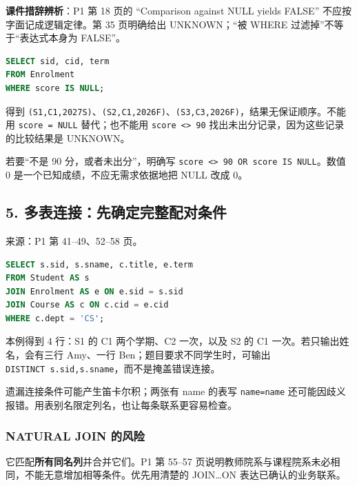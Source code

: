 \textbf{课件措辞辨析}：P1 第 18 页的 ``Comparison against NULL yields FALSE'' 不应按字面记成逻辑定律。第 35 页明确给出 UNKNOWN；``被 WHERE 过滤掉''不等于``表达式本身为 FALSE''。

\Needspace{75pt}
\begin{lstlisting}[language=SQL]
SELECT sid, cid, term
FROM Enrolment
WHERE score IS NULL;
\end{lstlisting}

得到 \texttt{(\allowbreak{}S1,\allowbreak{}C1,\allowbreak{}2027S)\allowbreak{}}、\texttt{(\allowbreak{}S2,\allowbreak{}C1,\allowbreak{}2026F)\allowbreak{}}、\texttt{(\allowbreak{}S3,\allowbreak{}C3,\allowbreak{}2026F)\allowbreak{}}，结果无保证顺序。不能用 \texttt{score\ =\ NULL} 替代；也不能用 \texttt{score\ \textless{}\textgreater{}\ 90} 找出未出分记录，因为这些记录的比较结果是 UNKNOWN。

若要``不是 90 分，或者未出分''，明确写 \texttt{score\ \textless{}\textgreater{}\ 90\ OR\ score\ IS\ NULL}。数值 0 是一个已知成绩，不应无需求依据地把 NULL 改成 0。

\subsection{5. 多表连接：先确定完整配对条件}\label{06_sql_queries_zh-ux591aux8868ux8fdeux63a5ux5148ux786eux5b9aux5b8cux6574ux914dux5bf9ux6761ux4ef6}

来源：P1 第 41--49、52--58 页。

\Needspace{105pt}
\begin{lstlisting}[language=SQL]
SELECT s.sid, s.sname, c.title, e.term
FROM Student AS s
JOIN Enrolment AS e ON e.sid = s.sid
JOIN Course AS c ON c.cid = e.cid
WHERE c.dept = 'CS';
\end{lstlisting}

本例得到 4 行：S1 的 C1 两个学期、C2 一次，以及 S2 的 C1 一次。若只输出姓名，会有三行 Amy、一行 Ben；题目要求不同学生时，可输出 \texttt{DISTINCT\ s.\allowbreak{}sid,\allowbreak{}s.\allowbreak{}sname}，而不是掩盖错误连接。

遗漏连接条件可能产生笛卡尔积；两张有 name 的表写 \texttt{name=name} 还可能因歧义报错。用表别名限定列名，也让每条联系更容易检查。

\subsubsection{NATURAL JOIN 的风险}\label{06_sql_queries_zh-natural-join-ux7684ux98ceux9669}

它匹配\textbf{所有同名列}并合并它们。P1 第 55--57 页说明教师院系与课程院系未必相同，不能无意增加相等条件。优先用清楚的 JOIN\ldots ON 表达已确认的业务联系。

